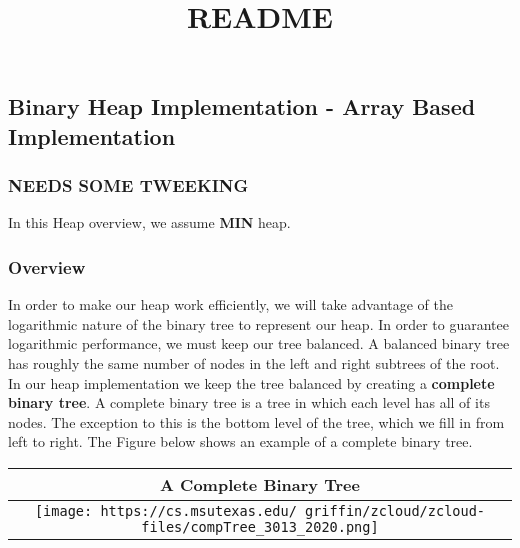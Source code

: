 \documentclass[
]{article}
\title{README}
\author{}
\date{}
\begin{document}
\maketitle

\hypertarget{binary-heap-implementation---array-based-implementation}{%
\subsection{Binary Heap Implementation - Array Based
Implementation}\label{binary-heap-implementation---array-based-implementation}}

\hypertarget{needs-some-tweeking}{%
\subsubsection{NEEDS SOME TWEEKING}\label{needs-some-tweeking}}

In this Heap overview, we assume \textbf{MIN} heap.

\hypertarget{overview}{%
\subsubsection{Overview}\label{overview}}

In order to make our heap work efficiently, we will take advantage of
the logarithmic nature of the binary tree to represent our heap. In
order to guarantee logarithmic performance, we must keep our tree
balanced. A balanced binary tree has roughly the same number of nodes in
the left and right subtrees of the root. In our heap implementation we
keep the tree balanced by creating a \textbf{complete binary tree}. A
complete binary tree is a tree in which each level has all of its nodes.
The exception to this is the bottom level of the tree, which we fill in
from left to right. The Figure below shows an example of a complete
binary tree.

\begin{longtable}[]{@{}c@{}}
\toprule
A Complete Binary Tree\tabularnewline
\midrule
\endhead
\texttt{[image: https://cs.msutexas.edu/~griffin/zcloud/zcloud-files/compTree\_3013\_2020.png]}\tabularnewline
\bottomrule
\end{longtable}
\end{document}
